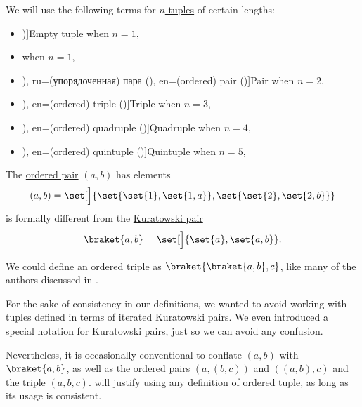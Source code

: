 \begin{definition}\label{def:ordered_tuple_length_terminology}
  We will use the following terms for \hyperref[def:ordered_tuple]{\( n \)-tuples} of certain lengths:
  \begin{itemize}
    \item \term[en=empty tuple (\cite[example 3.5.10]{Tao2022AnalysisI})]{Empty tuple} when \( n = 1 \),
    \item {} when \( n = 1 \),
    \item \term[bg=наредена двойка (\cite[367]{ГеновМиховскиМоллов1991Алгебра}), ru=(упорядоченная) пара (\cite[38]{БелоусовТкачёв2004ДискретнаяМатематика}), en=(ordered) pair (\cite[23]{Halmos1960Sets})]{Pair} when \( n = 2 \),
    \item \term[ru=(упорядоченная) тройка (\cite[39]{БелоусовТкачёв2004ДискретнаяМатематика}), en=(ordered) triple (\cite[42]{Enderton1977Sets})]{Triple} when \( n = 3 \),
    \item \term[ru=(упорядоченная) четвёрка (\cite[39]{БелоусовТкачёв2004ДискретнаяМатематика}), en=(ordered) quadruple (\cite[42]{Enderton1977Sets})]{Quadruple} when \( n = 4 \),
    \item \term[ru=(упорядоченная) пятёрка (\cite[39]{БелоусовТкачёв2004ДискретнаяМатематика}), en=(ordered) quintuple (\cite[42]{Enderton1977Sets})]{Quintuple} when \( n = 5 \),
  \end{itemize}
\end{definition}

\begin{remark}\label{rem:kuratowski_pairs_and_tuples}
  The \hyperref[def:ordered_tuple]{ordered pair} \( (a, b) \) has elements
  \begin{equation*}
    (a, b) = \set[\Big]{ \set{ \set{ 1 }, \set{ 1, a } }, \set{ \set{ 2 }, \set{ 2, b } } }
  \end{equation*}
  is formally different from the \hyperref[def:kuratowski_pair]{Kuratowski pair}
  \begin{equation*}
    \braket{ a, b } = \set[\Big]{ \set{ a }, \set{ a, b } }.
  \end{equation*}

  We could define an ordered triple as \( \braket{ \braket{ a, b }, c } \), like many of the authors discussed in .

  For the sake of consistency in our definitions, we wanted to avoid working with tuples defined in terms of iterated Kuratowski pairs. We even introduced a special notation for Kuratowski pairs, just so we can avoid any confusion.

  Nevertheless, it is occasionally conventional to conflate \( (a, b) \) with \( \braket{ a, b } \), as well as the ordered pairs \( (a, (b, c)) \) and \( ((a, b), c) \) and the triple \( (a, b, c) \).  will justify using any definition of ordered tuple, as long as its usage is consistent.
\end{remark}

